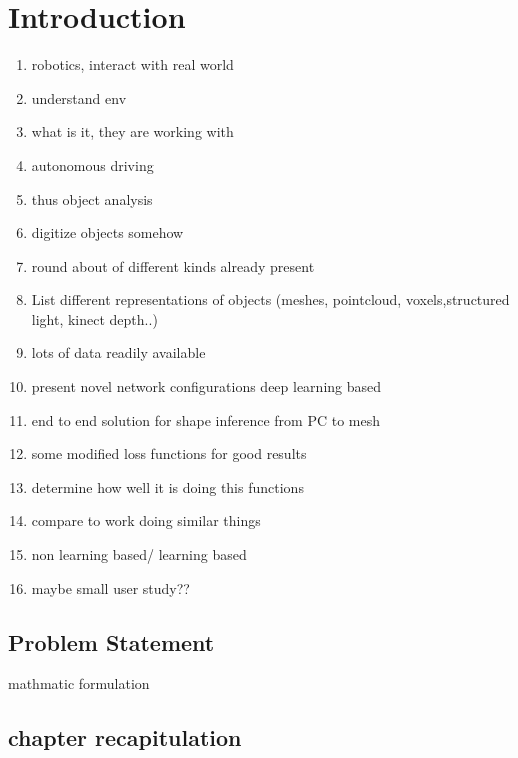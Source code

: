 
\chapter{Introduction}


\begin{enumerate}
    \item robotics, interact with real world
    \item understand env
    \item what is it, they are working with
    \item autonomous driving 
    \item thus object analysis 
    \item digitize objects somehow
    \item round about of different kinds already present
    \item List different representations of objects (meshes, pointcloud, voxels,structured light, kinect depth..)
    \item lots of data readily available
    \item present novel network configurations deep learning based
    \item end to end solution for shape inference from PC to mesh
    \item some modified loss functions for good results
    \item determine how well it is doing this functions
    \item compare to work doing similar things
    \item non learning based/ learning based
    \item maybe small user study??
  \end{enumerate}
\section{Problem Statement}
mathmatic formulation
\section{chapter recapitulation}